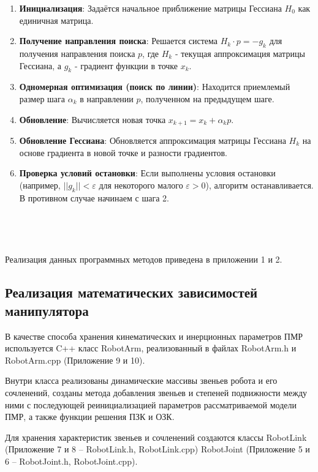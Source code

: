 \begin{itemize}
\begin{enumerate}
\item \textbf{Инициализация}: Задаётся начальное приближение матрицы Гессиана $H_0$ как единичная матрица.

\item \textbf{Получение направления поиска}: Решается система $H_k \cdot p = -g_k$ для получения направления поиска $p$, где $H_k$ - текущая аппроксимация матрицы Гессиана, а $g_k$ - градиент функции в точке $x_k$.

\item \textbf{Одномерная оптимизация (поиск по линии)}: Находится приемлемый размер шага $\alpha_k$ в направлении $p$, полученном на предыдущем шаге.

\item \textbf{Обновление}: Вычисляется новая точка $x_{k+1} = x_k + \alpha_k p$.

\item \textbf{Обновление Гессиана}: Обновляется аппроксимация матрицы Гессиана $H_k$ на основе градиента в новой точке и разности градиентов.

\item \textbf{Проверка условий остановки}: Если выполнены условия остановки (например, $||g_k|| < \varepsilon$ для некоторого малого $\varepsilon > 0$), алгоритм останавливается. В противном случае начинаем с шага 2.
\end{enumerate}

\end{itemize}

~

~

Реализация данных программных методов приведена в приложении 1 и 2.

\newpage
\subsection{\textbf{Реализация математических зависимостей манипулятора}}

В качестве способа хранения кинематических и инерционных параметров ПМР используется C++ класс RobotArm, реализованный в файлах RobotArm.h и RobotArm.cpp (Приложение 9 и 10).

Внутри класса реализованы динамические массивы звеньев робота и его сочленений, созданы метода добавления звеньев и степеней подвижности между ними с последующей реинициализацией параметров рассматриваемой модели ПМР, а также функции решения ПЗК и ОЗК.

Для хранения характеристик звеньев и сочленений создаются классы RobotLink (Приложение 7 и 8 -- RobotLink.h, RobotLink.cpp) RobotJoint (Приложение 5 и 6 -- RobotJoint.h, RobotJoint.cpp).

